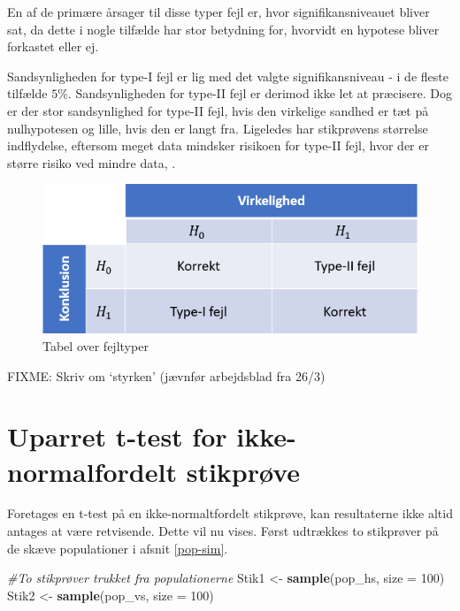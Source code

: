 \documentclass[
]{book}
\newenvironment{Shaded}{\begin{snugshade}}{\end{snugshade}}
\newcommand{\CommentTok}[1]{\textcolor[rgb]{0.56,0.35,0.01}{\textit{#1}}}
\newcommand{\DataTypeTok}[1]{\textcolor[rgb]{0.13,0.29,0.53}{#1}}
\newcommand{\DecValTok}[1]{\textcolor[rgb]{0.00,0.00,0.81}{#1}}
\newcommand{\KeywordTok}[1]{\textcolor[rgb]{0.13,0.29,0.53}{\textbf{#1}}}
\newcommand{\NormalTok}[1]{#1}
\newcommand{\StringTok}[1]{\textcolor[rgb]{0.31,0.60,0.02}{#1}}
\theoremstyle{definition}
\theoremstyle{definition}
\theoremstyle{definition}
\theoremstyle{remark}
\begin{document}
En af de primære årsager til disse typer fejl er, hvor signifikansniveauet bliver sat, da dette i nogle tilfælde har stor betydning for, hvorvidt en hypotese bliver forkastet eller ej.

Sandsynligheden for type-I fejl er lig med det valgte signifikansniveau - i de fleste tilfælde \(5\%\). Sandsynligheden for type-II fejl er derimod ikke let at præcisere. Dog er der stor sandsynlighed for type-II fejl, hvis den virkelige sandhed er tæt på nulhypotesen og lille, hvis den er langt fra. Ligeledes har stikprøvens størrelse indflydelse, eftersom meget data mindsker risikoen for type-II fejl, hvor der er større risiko ved mindre data, \citep{Fejltyper}.

\begin{figure}

{\centering \includegraphics[width=0.75\linewidth]{images/Typefejl} 

}

\caption{Tabel over fejltyper}\label{fig:figur-typefejl}
\end{figure}

FIXME: Skriv om `styrken' (jævnfør arbejdsblad fra 26/3)

\hypertarget{uparret-t-test-for-ikke-normalfordelt-stikpruxf8ve}{%
\section{Uparret t-test for ikke-normalfordelt stikprøve}\label{uparret-t-test-for-ikke-normalfordelt-stikpruxf8ve}}

Foretages en t-test på en ikke-normaltfordelt stikprøve, kan resultaterne ikke altid antages at være retvisende. Dette vil nu vises. Først udtrækkes to stikprøver på de skæve populationer i afsnit \ref{pop-sim}.

\begin{Shaded}
\begin{Highlighting}[]
\CommentTok{#To stikprøver trukket fra populationerne}
\NormalTok{Stik1 <-}\StringTok{ }\KeywordTok{sample}\NormalTok{(pop_hs, }\DataTypeTok{size =} \DecValTok{100}\NormalTok{)}
\NormalTok{Stik2 <-}\StringTok{ }\KeywordTok{sample}\NormalTok{(pop_vs, }\DataTypeTok{size =} \DecValTok{100}\NormalTok{)}
\end{Highlighting}
\end{Shaded}
\end{document}
